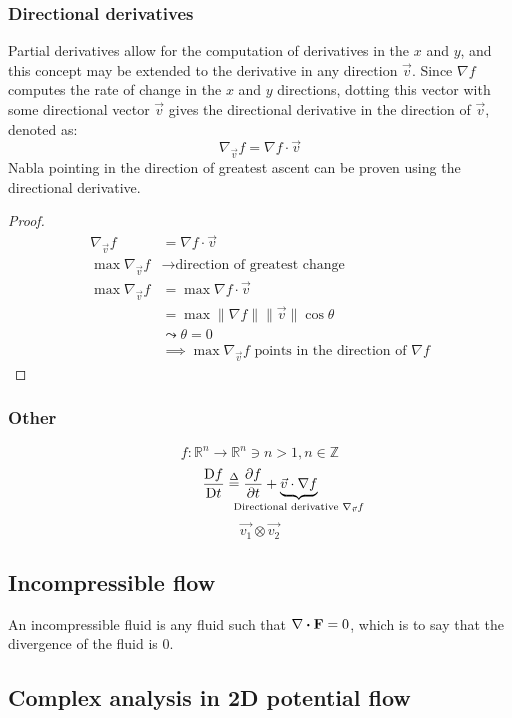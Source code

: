 \subsubsection*{Directional derivatives}
Partial derivatives allow for the computation of derivatives in the $x$ and $y$, and this concept may be extended to the derivative in any direction $\vec{v}$. Since $\nabla f$ computes the rate of change in the $x$ and $y$ directions, dotting this vector with some directional vector $\vec{v}$ gives the directional derivative in the direction of $\vec{v}$, denoted as:
\begin{equation}
	\nabla_{\vec{v}}f=\nabla f\cdot\vec{v}
\end{equation}
Nabla pointing in the direction of greatest ascent can be proven using the directional derivative.
\begin{proof}\label{p:nablagreatestchange}
	\begin{align*}
		\nabla_{\vec{v}}f&=\nabla f\cdot\vec{v}\\
		\max\nabla_{\vec{v}}f&\rightarrow\text{direction of greatest change}\\
		\max\nabla_{\vec{v}}f&=\max\nabla f\cdot\vec{v}\\
		&=\max\lVert\nabla f\rVert\lVert\vec{v}\rVert\cos{\theta}\\
		&\leadsto\theta=0\\
		&\implies\max\nabla_{\vec{v}}f\text{ points in the direction of }\nabla f
	\end{align*}
\end{proof}
\subsubsection*{Other}
$$f:\mathbb{R}^n\rightarrow\mathbb{R}^n\ni n>1,n\in\mathbb{Z}$$
\begin{equation}
	\materialder{f}{t}\definedas\partialder{f}{t}+\underbrace{\vec{v}\cdot\nabla f}_{\hidewidth\text{Directional derivative }\nabla_{\vec{v}}f\hidewidth}
\end{equation}
$$\vec{v_1}\otimes\vec{v_2}$$

\subsection{Incompressible flow}
An incompressible fluid is any fluid such that $\divergence\fatf=0$, which is to say that the divergence of the fluid is 0.

\subsection{Complex analysis in 2D potential flow}

